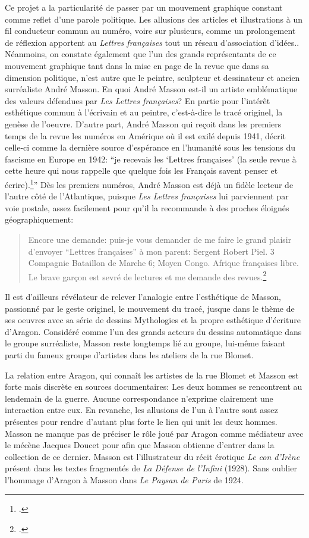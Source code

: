 Ce projet a la particularité de passer par un mouvement graphique constant comme reflet d’une parole politique. Les allusions des articles et illustrations à un fil conducteur commun au numéro, voire sur plusieurs, comme un prolongement de réflexion apportent au \emph{Lettres françaises }tout un réseau d'association d'idées.. Néanmoins, on constate également que l’un des grands représentants de ce mouvement graphique tant dans la mise en page de la revue que dans sa dimension politique, n’est autre que le peintre, sculpteur et dessinateur et ancien surréaliste André Masson. En quoi André Masson est-il un artiste emblématique des valeurs défendues par \emph{Les Lettres françaises}? En partie pour l’intérêt esthétique commun à l’écrivain et au peintre, c’est-à-dire le tracé originel, la genèse de l’oeuvre. D’autre part, André Masson qui reçoit dans les premiers temps de la revue les numéros en Amérique où il est exilé depuis 1941, décrit celle-ci comme la dernière source d’espérance en l’humanité sous les tensions du fascisme en Europe en 1942: \enquote{je recevais les \enquote{Lettres françaises} (la seule revue à cette heure qui nous rappelle que quelque fois les Français savent penser et écrire).\footcite[]{anneessurrealistes}} Dès les premiers numéros, André Masson est déjà un fidèle lecteur de l’autre côté de l’Atlantique, puisque \emph{Les Lettres françaises} lui parviennent par voie postale, assez facilement pour qu’il la recommande à des proches éloignés géographiquement: 
\begin{quote}
Encore une demande: puis-je vous demander de me faire le grand plaisir d’envoyer \enquote{Lettres françaises} à mon parent: Sergent Robert Piel. 3\ieme{} Compagnie Bataillon de Marche \No{}6; Moyen Congo. Afrique françaises libre. Le brave garçon est sevré de lectures et me demande des revues.\footcite[]{anneessurrealistes}
\end{quote}
Il est d’ailleurs révélateur de relever l’analogie entre l’esthétique de Masson, passionné par le geste originel, le mouvement du tracé, jusque dans le thème de ses oeuvres avec sa série de dessins Mythologies et la propre esthétique d’écriture d’Aragon. Considéré comme l’un des grands acteurs du dessins automatique dans le groupe surréaliste, Masson reste longtemps lié au groupe, lui-même faisant parti du fameux groupe d’artistes dans les ateliers de la rue Blomet. 

La relation entre Aragon, qui connaît les artistes de la rue Blomet et Masson est forte mais discrète en sources documentaires: Les deux hommes se rencontrent au lendemain de la guerre. Aucune correspondance n’exprime clairement une interaction entre eux. En revanche, les allusions de l’un à l’autre sont assez présentes pour rendre d’autant plus forte le lien qui unit les deux hommes. Masson ne manque pas de préciser le rôle joué par Aragon comme médiateur avec le mécène Jacques Doucet pour afin que Masson obtienne d’entrer dans la collection de ce dernier. Masson est l’illustrateur du récit érotique \emph{Le con d'Irène} présent dans les textes fragmentés de \emph{La Défense de l’Infini} (1928). Sans oublier l’hommage d’Aragon à Masson dans \emph{Le Paysan de Paris} de 1924. 

